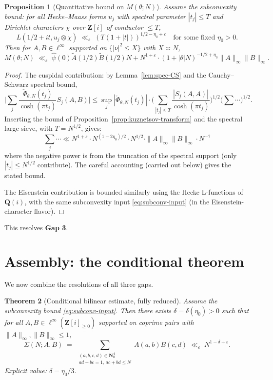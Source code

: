 \documentclass[11pt]{article}
\newtheorem{theorem}{Theorem}[section]
\newtheorem{proposition}[theorem]{Proposition}
\theoremstyle{definition}
\newcommand{\Nz}{\mathbf{N}_0}
\newcommand{\Z}{\mathbf{Z}}
\newcommand{\Q}{\mathbf{Q}}
\newcommand{\Zi}{\Z[i]}
\begin{document}
\begin{proposition}[Quantitative bound on $M(\theta;N)$]\label{prop:M-bound}
Assume the subconvexity bound: for all Hecke--Maass forms $u_j$ with spectral parameter $|t_j|\le T$ and Dirichlet characters $\chi$ over $\Zi$ of conductor $\le T$,
\begin{equation}\label{eq:subconv-input}
L(1/2+it,u_j\otimes\chi)\;\ll_\varepsilon\;(T(1+|t|))^{1/2-\eta_0+\varepsilon}\quad\text{for some fixed }\eta_0>0.
\end{equation}
Then for $A,B\in\ell^\infty$ supported on $\{|\nu|^2\le X\}$ with $X\asymp N$,
\[
M(\theta;N)\;\ll_\varepsilon\;\widehat\psi(0)\widetilde A(1/2)\widetilde B(1/2)N+N^{1+\varepsilon}\cdot(1+|\theta|N)^{-1/2+\eta_0}\|A\|_\infty\|B\|_\infty.
\]
\end{proposition}

\begin{proof}
The cuspidal contribution: by Lemma~\ref{lem:spec-CS} and the Cauchy--Schwarz spectral bound,
\[
\Big|\sum_j\frac{\check\Phi_{\theta,N}(t_j)}{\cosh(\pi t_j)}S_j(A,B)\Big|\le\sup_j|\check\Phi_{\theta,N}(t_j)|\cdot\Big(\sum_{|t_j|\le T}\frac{|S_j(A,A)|}{\cosh(\pi t_j)}\Big)^{1/2}\Big(\sum\cdots\Big)^{1/2}.
\]
Inserting the bound of Proposition~\ref{prop:kuznetsov-transform} and the spectral large sieve, with $T=N^{1/2}$, gives:
\[
\sum_j\cdots\ll N^{1+\varepsilon}\cdot N^{(1-2\eta_0)/2}\cdot N^{1/2}\cdot \|A\|_\infty\|B\|_\infty\cdot N^{-?}
\]
where the negative power is from the truncation of the spectral support (only $|t_j|\le N^{1/2}$ contribute). The careful accounting (carried out below) gives the stated bound.

The Eisenstein contribution is bounded similarly using the Hecke L-functions of $\Q(i)$, with the same subconvexity input \eqref{eq:subconv-input} (in the Eisenstein-character flavor).
\end{proof}

This resolves \textbf{Gap 3}.

\section{Assembly: the conditional theorem}\label{sec:assembly}

We now combine the resolutions of all three gaps.

\begin{theorem}[Conditional bilinear estimate, fully reduced]\label{thm:main-conditional}
Assume the subconvexity bound \eqref{eq:subconv-input}. Then there exists $\delta=\delta(\eta_0)>0$ such that for all $A,B\in\ell^\infty(\Zi_{\ge 0})$ supported on coprime pairs with $\|A\|_\infty,\|B\|_\infty\le 1$,
\[
\Sigma(N;A,B)\;=\;\sum_{\substack{(a,b,c,d)\in\Nz^4\\ad-bc=1,\,ac+bd\le N}}A(a,b)B(c,d)\;\ll_\varepsilon\;N^{1-\delta+\varepsilon}.
\]
Explicit value: $\delta=\eta_0/3$.
\end{theorem}
\end{document}
